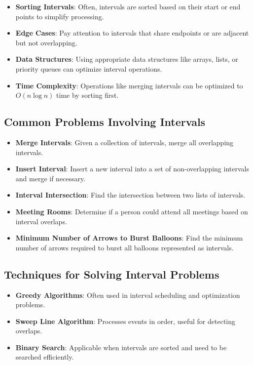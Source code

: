 \begin{itemize}
    \item \textbf{Sorting Intervals}: Often, intervals are sorted based on their start or end points to simplify processing.
    \item \textbf{Edge Cases}: Pay attention to intervals that share endpoints or are adjacent but not overlapping.
    \item \textbf{Data Structures}: Using appropriate data structures like arrays, lists, or priority queues can optimize interval operations.
    \item \textbf{Time Complexity}: Operations like merging intervals can be optimized to \(O(n \log n)\) time by sorting first.
\end{itemize}

\subsection{Common Problems Involving Intervals}

\begin{itemize}
    \item \textbf{Merge Intervals}: Given a collection of intervals, merge all overlapping intervals.
    \item \textbf{Insert Interval}: Insert a new interval into a set of non-overlapping intervals and merge if necessary.
    \item \textbf{Interval Intersection}: Find the intersection between two lists of intervals.
    \item \textbf{Meeting Rooms}: Determine if a person could attend all meetings based on interval overlaps.
    \item \textbf{Minimum Number of Arrows to Burst Balloons}: Find the minimum number of arrows required to burst all balloons represented as intervals.
\end{itemize}

\subsection{Techniques for Solving Interval Problems}

\begin{itemize}
    \item \textbf{Greedy Algorithms}: Often used in interval scheduling and optimization problems.
    \item \textbf{Sweep Line Algorithm}: Processes events in order, useful for detecting overlaps.
    \item \textbf{Binary Search}: Applicable when intervals are sorted and need to be searched efficiently.
\end{itemize}

